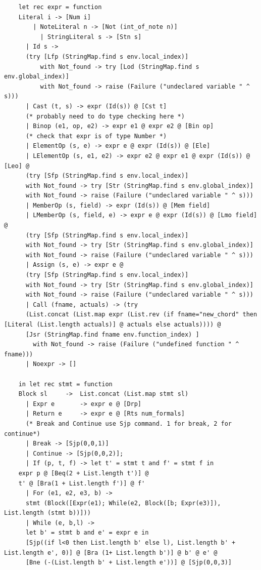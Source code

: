 \documentclass[12pt,A4]{book}
\begin{document}
\begin{verbatim}
    let rec expr = function
	Literal i -> [Num i]
	    | NoteLiteral n -> [Not (int_of_note n)]
		  | StringLiteral s -> [Stn s]
      | Id s ->
	  (try [Lfp (StringMap.find s env.local_index)]
          with Not_found -> try [Lod (StringMap.find s env.global_index)]
          with Not_found -> raise (Failure ("undeclared variable " ^ s)))
      | Cast (t, s) -> expr (Id(s)) @ [Cst t]
      (* probably need to do type checking here *)
      | Binop (e1, op, e2) -> expr e1 @ expr e2 @ [Bin op]
      (* check that expr is of type Number *)
      | ElementOp (s, e) -> expr e @ expr (Id(s)) @ [Ele]
      | LElementOp (s, e1, e2) -> expr e2 @ expr e1 @ expr (Id(s)) @ [Leo] @
	  (try [Sfp (StringMap.find s env.local_index)]
  	  with Not_found -> try [Str (StringMap.find s env.global_index)]
	  with Not_found -> raise (Failure ("undeclared variable " ^ s)))
      | MemberOp (s, field) -> expr (Id(s)) @ [Mem field]
      | LMemberOp (s, field, e) -> expr e @ expr (Id(s)) @ [Lmo field] @
	  (try [Sfp (StringMap.find s env.local_index)]
  	  with Not_found -> try [Str (StringMap.find s env.global_index)]
	  with Not_found -> raise (Failure ("undeclared variable " ^ s)))
      | Assign (s, e) -> expr e @
	  (try [Sfp (StringMap.find s env.local_index)]
  	  with Not_found -> try [Str (StringMap.find s env.global_index)]
	  with Not_found -> raise (Failure ("undeclared variable " ^ s)))
      | Call (fname, actuals) -> (try
	  (List.concat (List.map expr (List.rev (if fname="new_chord" then [Literal (List.length actuals)] @ actuals else actuals)))) @
	  [Jsr (StringMap.find fname env.function_index) ]
        with Not_found -> raise (Failure ("undefined function " ^ fname)))
      | Noexpr -> []

    in let rec stmt = function
	Block sl     ->  List.concat (List.map stmt sl)
      | Expr e       -> expr e @ [Drp]
      | Return e     -> expr e @ [Rts num_formals]
      (* Break and Continue use Sjp command. 1 for break, 2 for continue*)
      | Break -> [Sjp(0,0,1)]
      | Continue -> [Sjp(0,0,2)];
      | If (p, t, f) -> let t' = stmt t and f' = stmt f in
	expr p @ [Beq(2 + List.length t')] @
	t' @ [Bra(1 + List.length f')] @ f'
      | For (e1, e2, e3, b) ->
	  stmt (Block([Expr(e1); While(e2, Block([b; Expr(e3)]), List.length (stmt b))]))
      | While (e, b,l) -> 
	  let b' = stmt b and e' = expr e in
	  [Sjp((if l<0 then List.length b' else l), List.length b' + List.length e', 0)] @ [Bra (1+ List.length b')] @ b' @ e' @
	  [Bne (-(List.length b' + List.length e'))] @ [Sjp(0,0,3)]


\end{verbatim}
\end{document}
